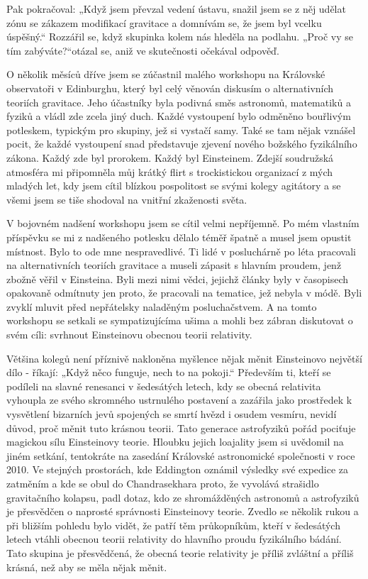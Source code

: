   Pak pokračoval: „Když jsem převzal vedení ústavu, snažil jsem se z něj udělat zónu se zákazem
  modifikací gravitace a domnívám se, že jsem byl vcelku úspěšný.“ Rozzářil se, když skupinka kolem
  nás hleděla na podlahu. „Proč vy se tím zabýváte?“otázal se, aniž ve skutečnosti očekával odpověď.
  
  O několik měsíců dříve jsem se zúčastnil malého workshopu na Královské observatoři v Edinburghu,
  který byl celý věnován diskusím o alternativních teoriích gravitace. Jeho účastníky byla podivná
  směs astronomů, matematiků a fyziků a vládl zde zcela jiný duch. Každé vystoupení bylo odměněno
  bouřlivým potleskem, typickým pro skupiny, jež si vystačí samy. Také se tam nějak vznášel pocit,
  že každé vystoupení snad představuje zjevení nového božského fyzikálního zákona. Každý zde byl
  prorokem. Každý byl Einsteinem. Zdejší soudružská atmosféra mi připomněla můj krátký flirt s
  trockistickou organizací z mých mladých let, kdy jsem cítil blízkou pospolitost se svými kolegy
  agitátory a se všemi jsem se tiše shodoval na vnitřní zkaženosti světa. 
  
  V bojovném nadšení workshopu jsem se cítil velmi nepříjemně. Po mém vlastním příspěvku se mi z
  nadšeného potlesku dělalo téměř špatně a musel jsem opustit místnost. Bylo to ode mne
  nespravedlivé. Ti lidé v posluchárně po léta pracovali na alternativních teoriích gravitace a
  museli zápasit s hlavním proudem, jenž zbožně věřil v Einsteina. Byli mezi nimi vědci, jejichž
  články byly v časopisech opakovaně odmítnuty jen proto, že pracovali na tematice, jež nebyla v
  módě. Byli zvyklí mluvit před nepřátelsky naladěným posluchačstvem. A na tomto workshopu se
  setkali se sympatizujícíma ušima a mohli bez zábran diskutovat o svém cíli: svrhnout Einsteinovu
  obecnou teorii relativity. 
  
  Většina kolegů není příznivě nakloněna myšlence nějak měnit Einsteinovo největší dílo - říkají:
  „Když něco funguje, nech to na pokoji.“ Především ti, kteří se podíleli na slavné renesanci v
  šedesátých letech, kdy se obecná relativita vyhoupla ze svého skromného ustrnulého postavení a
  zazářila jako prostředek k vysvětlení bizarních jevů spojených se smrtí hvězd i osudem vesmíru,
  nevidí důvod, proč měnit tuto krásnou teorii. Tato generace astrofyziků pořád pociťuje magickou
  sílu Einsteinovy teorie. Hloubku jejich loajality jsem si uvědomil na jiném setkání, tentokráte na
  zasedání Královské astronomické společnosti v roce 2010. Ve stejných prostorách, kde Eddington
  oznámil výsledky své expedice za zatměním a kde se obul do Chandrasekhara proto, že vyvolává
  strašidlo gravitačního kolapsu, padl dotaz, kdo ze shromážděných astronomů a astrofyziků je
  přesvědčen o naprosté správnosti Einsteinovy teorie. Zvedlo se několik rukou a při bližším pohledu
  bylo vidět, že patří těm průkopníkům, kteří v šedesátých letech vtáhli obecnou teorii relativity
  do hlavního proudu fyzikálního bádání. Tato skupina je přesvědčená, že obecná teorie relativity je
  příliš zvláštní a příliš krásná, než aby se měla nějak měnit. 
  
